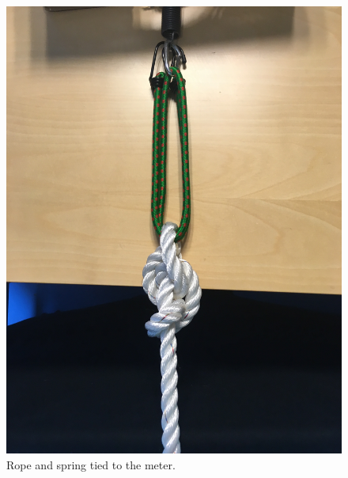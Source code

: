 \begin{figure}[H]
  \centering
  \hfill
  \begin{minipage}[b]{0.4\textwidth}
    \includegraphics[width=\textwidth]{Images/rope.JPG}
    \caption{Rope and spring tied to the meter.}
     \label{fig:setupRopeBox1}
    \end{minipage}
  \hfill
  \begin{minipage}[b]{0.4\textwidth}

\end{minipage}
\end{figure}
